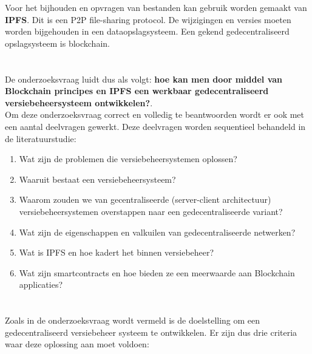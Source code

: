 Voor het bijhouden en opvragen van bestanden kan gebruik worden gemaakt van \textbf{IPFS}. Dit is een P2P file-sharing protocol. De wijzigingen en versies moeten worden bijgehouden in een dataopslagsysteem. Een gekend gedecentraliseerd opslagsysteem is blockchain.


\section{}
\label{sec:onderzoeksvraag}
De onderzoeksvraag luidt dus als volgt: \textbf{hoe kan men door middel van Blockchain principes en IPFS een werkbaar gedecentraliseerd versiebeheersysteem ontwikkelen?}.\\

Om deze onderzoeksvraag correct en volledig te beantwoorden wordt er ook met een aantal deelvragen gewerkt. Deze deelvragen worden sequentieel behandeld in de literatuurstudie:

\begin{enumerate}
\item Wat zijn de problemen die versiebeheersystemen oplossen? \\
\item Waaruit bestaat een versiebeheersysteem? \\
\item Waarom zouden we van gecentraliseerde (server-client architectuur) versiebeheersystemen overstappen naar een gedecentraliseerde variant?         \\
\item Wat zijn de eigenschappen en valkuilen van gedecentraliseerde netwerken?\\
\item Wat is IPFS en hoe kadert het binnen versiebeheer?\\
\item Wat zijn smartcontracts en hoe bieden ze een meerwaarde aan Blockchain applicaties?\\
\end{enumerate}


\section{}
\label{sec:onderzoeksdoelstelling}

Zoals in de onderzoeksvraag wordt vermeld is de doelstelling om een gedecentraliseerd versiebeheer systeem te ontwikkelen. Er zijn dus drie criteria waar deze oplossing aan moet voldoen:

